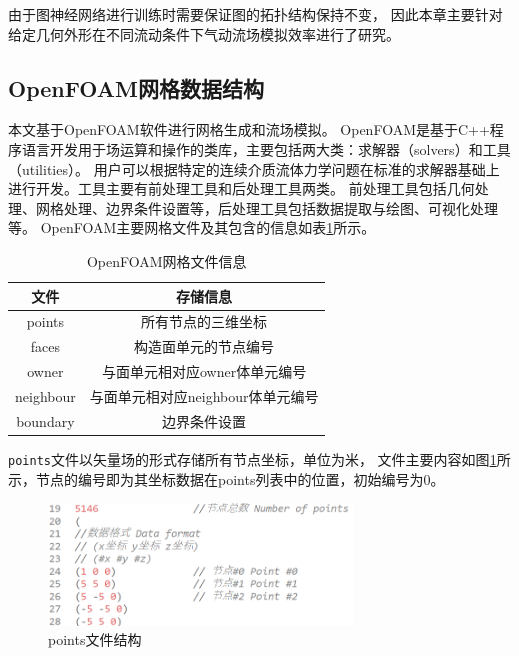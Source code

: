 由于图神经网络进行训练时需要保证图的拓扑结构保持不变，
因此本章主要针对给定几何外形在不同流动条件下气动流场模拟效率进行了研究。



\subsection{OpenFOAM网格数据结构}\label{meshstructure}
本文基于OpenFOAM软件进行网格生成和流场模拟。
OpenFOAM是基于C++程序语言开发用于场运算和操作的类库，主要包括两大类：求解器（solvers）和工具（utilities）。
用户可以根据特定的连续介质流体力学问题在标准的求解器基础上进行开发。工具主要有前处理工具和后处理工具两类。
前处理工具包括几何处理、网格处理、边界条件设置等，后处理工具包括数据提取与绘图、可视化处理等。
OpenFOAM主要网格文件及其包含的信息如表\ref{tab:openfoammesh}所示。

\begin{table}[htp]
	\setlength{\belowcaptionskip}{0.0cm}
	\caption{OpenFOAM网格文件信息}
	\label{tab:openfoammesh}
	\centering
	\begin{tabular}{c|c}
		\toprule
		文件 & 存储信息\\
		\midrule
		points  & 所有节点的三维坐标\\
		\midrule
		faces & 构造面单元的节点编号\\
		\midrule
		owner & 与面单元相对应owner体单元编号\\
		\midrule
		neighbour & 与面单元相对应neighbour体单元编号\\
		\midrule
		boundary & 边界条件设置\\		
		\bottomrule
	\end{tabular}
\end{table}

\texttt{points}文件以矢量场的形式存储所有节点坐标，单位为米，
文件主要内容如图\ref{fig:points_file}所示，节点的编号即为其坐标数据在points列表中的位置，初始编号为0。

\begin{figure}[htp]
	\centering
	\includegraphics[width=0.72\textwidth]{./figures/points.png}
	\caption{points文件结构}
	\label{fig:points_file}	
\end{figure}

